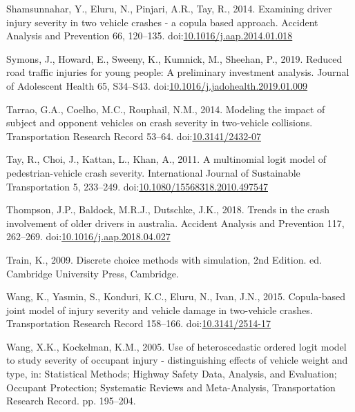 \documentclass[]{elsarticle} %
\begin{document}
\leavevmode\hypertarget{ref-Shamsunnahar2014examining}{}%
Shamsunnahar, Y., Eluru, N., Pinjari, A.R., Tay, R., 2014. Examining
driver injury severity in two vehicle crashes - a copula based approach.
Accident Analysis and Prevention 66, 120--135.
doi:\href{https://doi.org/10.1016/j.aap.2014.01.018}{10.1016/j.aap.2014.01.018}

\leavevmode\hypertarget{ref-Symons2019reduced}{}%
Symons, J., Howard, E., Sweeny, K., Kumnick, M., Sheehan, P., 2019.
Reduced road traffic injuries for young people: A preliminary investment
analysis. Journal of Adolescent Health 65, S34--S43.
doi:\href{https://doi.org/10.1016/j.jadohealth.2019.01.009}{10.1016/j.jadohealth.2019.01.009}

\leavevmode\hypertarget{ref-Tarrao2014modeling}{}%
Tarrao, G.A., Coelho, M.C., Rouphail, N.M., 2014. Modeling the impact of
subject and opponent vehicles on crash severity in two-vehicle
collisions. Transportation Research Record 53--64.
doi:\href{https://doi.org/10.3141/2432-07}{10.3141/2432-07}

\leavevmode\hypertarget{ref-Tay2011multinomial}{}%
Tay, R., Choi, J., Kattan, L., Khan, A., 2011. A multinomial logit model
of pedestrian-vehicle crash severity. International Journal of
Sustainable Transportation 5, 233--249.
doi:\href{https://doi.org/10.1080/15568318.2010.497547}{10.1080/15568318.2010.497547}

\leavevmode\hypertarget{ref-Thompson2018trends}{}%
Thompson, J.P., Baldock, M.R.J., Dutschke, J.K., 2018. Trends in the
crash involvement of older drivers in australia. Accident Analysis and
Prevention 117, 262--269.
doi:\href{https://doi.org/10.1016/j.aap.2018.04.027}{10.1016/j.aap.2018.04.027}

\leavevmode\hypertarget{ref-Train2009discrete}{}%
Train, K., 2009. Discrete choice methods with simulation, 2nd Edition.
ed. Cambridge University Press, Cambridge.

\leavevmode\hypertarget{ref-Wang2015copula}{}%
Wang, K., Yasmin, S., Konduri, K.C., Eluru, N., Ivan, J.N., 2015.
Copula-based joint model of injury severity and vehicle damage in
two-vehicle crashes. Transportation Research Record 158--166.
doi:\href{https://doi.org/10.3141/2514-17}{10.3141/2514-17}

\leavevmode\hypertarget{ref-Wang2005use}{}%
Wang, X.K., Kockelman, K.M., 2005. Use of heteroscedastic ordered logit
model to study severity of occupant injury - distinguishing effects of
vehicle weight and type, in: Statistical Methods; Highway Safety Data,
Analysis, and Evaluation; Occupant Protection; Systematic Reviews and
Meta-Analysis, Transportation Research Record. pp. 195--204.
\end{document}

